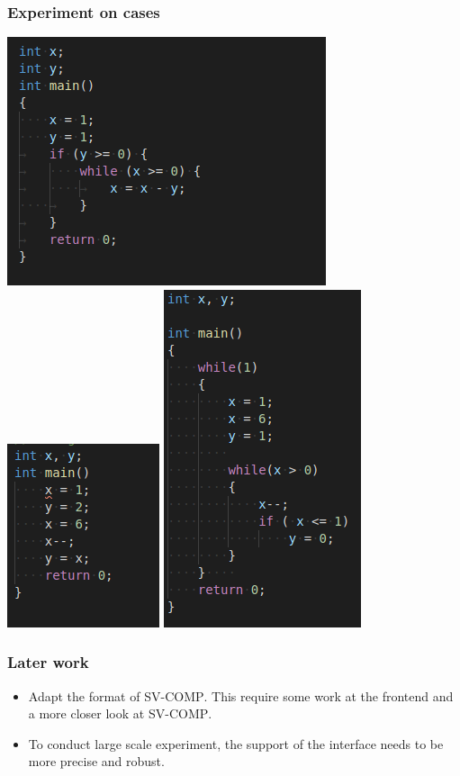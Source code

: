 \documentclass[11pt]{beamer}
\begin{document}
\begin{frame}\frametitle{Experiment on cases}
\begin{center}
\includegraphics[scale=0.4]{Bangalore.png}
\includegraphics[scale=.4]{test1.png}
\includegraphics[scale=.4]{test2.png}
\end{center}
\end{frame}

\begin{frame}\frametitle{Later work}

\begin{itemize}

\item Adapt the format of \textsc{SV-COMP}. This require some work at the frontend and a more closer look at \textsc{SV-COMP}.

\item To conduct large scale experiment, the support of the interface needs to be more precise and robust. 
\end{itemize}


\end{frame}
\end{document}

